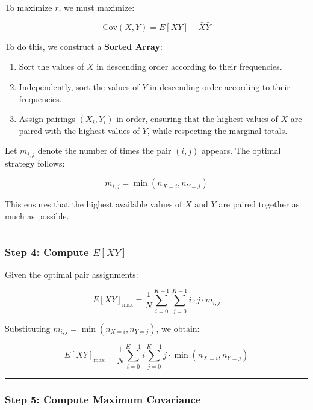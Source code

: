 \documentclass[
  12pt,
  letterpaper,
  DIV=11,
  numbers=noendperiod]{scrartcl}
\providecommand{\tightlist}{%
  \setlength{\itemsep}{0pt}\setlength{\parskip}{0pt}}\usepackage{longtable,booktabs,array}
\begin{document}
To maximize \(r\), we must maximize:

\[\text{Cov}(X,Y) = E[XY] - \bar{X} \bar{Y}\]

To do this, we construct a \textbf{Sorted Array}:

\begin{enumerate}
\def\labelenumi{\arabic{enumi}.}
\tightlist
\item
  Sort the values of \(X\) in descending order according to their
  frequencies.
\item
  Independently, sort the values of \(Y\) in descending order according
  to their frequencies.
\item
  Assign pairings \((X_i, Y_i)\) in order, ensuring that the highest
  values of \(X\) are paired with the highest values of \(Y\), while
  respecting the marginal totals.
\end{enumerate}

Let \(m_{i,j}\) denote the number of times the pair \((i,j)\) appears.
The optimal strategy follows:

\[m_{i,j} = \min(n_{X=i}, n_{Y=j})\]

This ensures that the highest available values of \(X\) and \(Y\) are
paired together as much as possible.

\begin{center}\rule{0.5\linewidth}{0.5pt}\end{center}

\subsubsection{\texorpdfstring{\textbf{Step 4: Compute
\(E[XY]\)}}{Step 4: Compute E{[}XY{]}}}\label{step-4-compute-exy-1}

Given the optimal pair assignments:

\[E[XY]_{\max} = \frac{1}{N} \sum_{i=0}^{K-1} \sum_{j=0}^{K-1} i \cdot j \cdot m_{i,j}\]

Substituting \(m_{i,j} = \min(n_{X=i}, n_{Y=j})\), we obtain:

\[E[XY]_{\max} = \frac{1}{N} \sum_{i=0}^{K-1} i \sum_{j=0}^{K-1} j \cdot \min(n_{X=i}, n_{Y=j})\]

\begin{center}\rule{0.5\linewidth}{0.5pt}\end{center}

\subsubsection{\texorpdfstring{\textbf{Step 5: Compute Maximum
Covariance}}{Step 5: Compute Maximum Covariance}}\label{step-5-compute-maximum-covariance-1}
\end{document}
